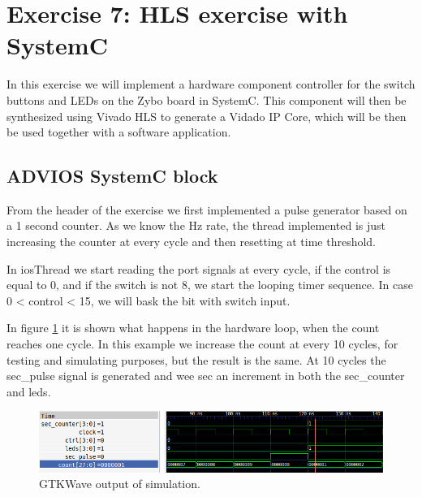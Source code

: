 \documentclass[a4paper,12pt]{report}    %
\begin{document}
\section{Exercise 7: HLS exercise with SystemC}

In this exercise we will implement a hardware component controller for the switch buttons and LEDs on the Zybo board in SystemC. This component will then be synthesized using Vivado HLS to generate a Vidado IP Core, which will be then be used together with a software application.

\subsection{ADVIOS SystemC block}

From the header of the exercise we first implemented a pulse generator based on a 1 second counter. As we know the Hz rate, the thread implemented is just increasing the counter at every cycle and then resetting at time threshold. 



In iosThread we start reading the port signals at every cycle, if the control is equal to 0, and if the switch is not 8, we start the looping timer sequence. In case 0 < control < 15, we will bask the bit with switch input.



In figure \ref{FIG::27::GTKWAVE} it is shown what happens in the hardware loop, when the count reaches one cycle. In this example we increase the count at every 10 cycles, for testing and simulating purposes, but the result is the same. At 10 cycles the sec\_pulse signal is generated and wee sec an increment in both the sec\_counter and leds.

\begin{figure}[H]
  \centering
  \includegraphics[width=\linewidth]{latex/figures/ass2_27_gtkwave.png}
  \caption{GTKWave output of simulation.}
  \label{FIG::27::GTKWAVE}
\end{figure}
\end{document}
